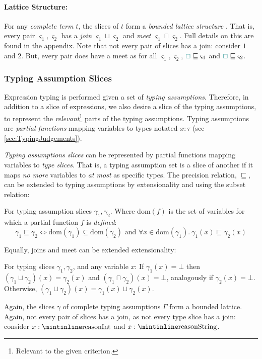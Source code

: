 \paragraph{Lattice Structure:}\label{sec:JoinTypesTheory} For any \textit{complete term} $t$, the slices of $t$ form a \textit{bounded lattice structure} \cite{Lattice}. That is, every pair $\varsigma_1, \varsigma_2$ has a \textit{join} $\varsigma_1 \sqcup \varsigma_2$ and \textit{meet} $\varsigma_1 \sqcap \varsigma_2$. Full details on this are found in the appendix. Note that not every pair of slices has a join: consider $1$ and $2$. But, every pair does have a meet as for all $\varsigma_1, \varsigma_2$, ${\color{teal}\Box} \sqsubseteq \varsigma_1$ and ${\color{teal}\Box} \sqsubseteq \varsigma_2$.
 
\subsubsection{Typing Assumption Slices}
Expression typing is performed given a set of \textit{typing assumptions}. Therefore, in addition to a slice of expressions, we also desire a slice of the typing assumptions, to represent the \textit{relevant}\footnote{Relevant to the given criterion.} parts of the typing assumptions. Typing assumptions are \textit{partial functions} mapping variables to types notated $x : \tau$ (see \cref{sec:TypingJudgements}). 

\textit{Typing assumptions slices} can be represented by partial functions mapping variables to \textit{type slices}. That is, a typing assumption set is a slice of another if it maps \textit{no more} variables to \textit{at most} as specific types. The precision relation, $\sqsubseteq$, can be extended to typing assumptions by extensionality \cite{Extensionality} and using the subset relation:

\begin{definition}
For typing assumption slices $\gamma_1, \gamma_2$. Where $\mathrm{dom}(f)$ is the set of variables for which a partial function $f$ is \textit{defined}:
\[\gamma_1 \sqsubseteq \gamma_2 \iff \mathrm{dom}(\gamma_1) \subseteq \mathrm{dom}(\gamma_2) \text{ and } \forall x \in  \mathrm{dom}(\gamma_1).\ \gamma_1(x) \sqsubseteq \gamma_2(x)\]
\end{definition}
Equally, joins and meet can be extended extensionality:
\begin{definition}
For typing slices $\gamma_1, \gamma_2$, and any variable $x$: If $\gamma_1(x) = \bot$ then $(\gamma_1 \sqcup \gamma_2)(x) = \gamma_2(x)$ and $(\gamma_1 \sqcap \gamma_2)(x) = \bot$, analogously if $\gamma_2(x) = \bot$. Otherwise, $(\gamma_1 \sqcup \gamma_2)(x) = \gamma_1(x) \sqcup \gamma_2(x)$.
\end{definition}
Again, the slices $\gamma$ of complete typing assumptions $\Gamma$ form a bounded lattice. Again, not every pair of slices has a join, as not every type slice has a join: consider $x : \code{Int}$ and $x : \code{String}$.


